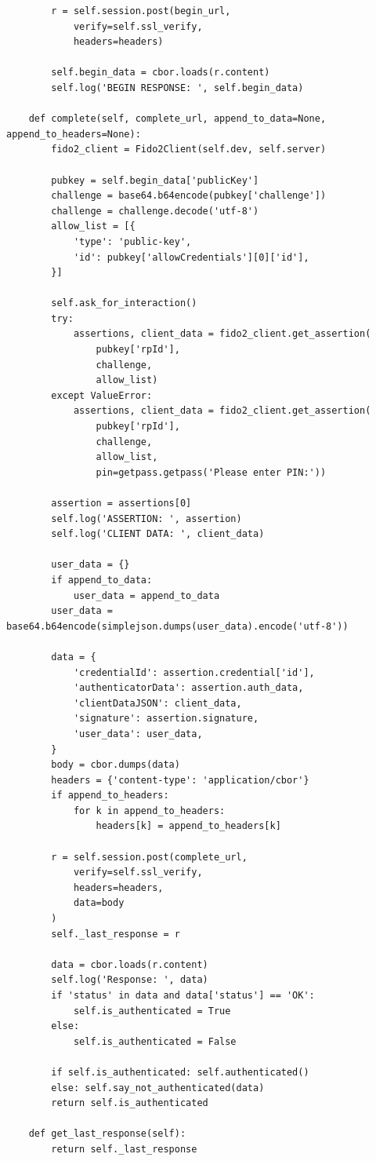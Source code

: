 \documentclass[11pt]{article}
\begin{document}
\begin{lstlisting}
        r = self.session.post(begin_url,
            verify=self.ssl_verify,
            headers=headers)

        self.begin_data = cbor.loads(r.content)
        self.log('BEGIN RESPONSE: ', self.begin_data)

    def complete(self, complete_url, append_to_data=None, append_to_headers=None):
        fido2_client = Fido2Client(self.dev, self.server)

        pubkey = self.begin_data['publicKey']
        challenge = base64.b64encode(pubkey['challenge'])
        challenge = challenge.decode('utf-8')
        allow_list = [{
            'type': 'public-key',
            'id': pubkey['allowCredentials'][0]['id'],
        }]

        self.ask_for_interaction()
        try:
            assertions, client_data = fido2_client.get_assertion(
                pubkey['rpId'],
                challenge,
                allow_list)
        except ValueError:
            assertions, client_data = fido2_client.get_assertion(
                pubkey['rpId'],
                challenge,
                allow_list,
                pin=getpass.getpass('Please enter PIN:'))

        assertion = assertions[0]
        self.log('ASSERTION: ', assertion)
        self.log('CLIENT DATA: ', client_data)

        user_data = {}
        if append_to_data:
            user_data = append_to_data
        user_data = base64.b64encode(simplejson.dumps(user_data).encode('utf-8'))

        data = {
            'credentialId': assertion.credential['id'],
            'authenticatorData': assertion.auth_data,
            'clientDataJSON': client_data,
            'signature': assertion.signature,
            'user_data': user_data,
        }
        body = cbor.dumps(data)
        headers = {'content-type': 'application/cbor'}
        if append_to_headers:
            for k in append_to_headers:
                headers[k] = append_to_headers[k]

        r = self.session.post(complete_url,
            verify=self.ssl_verify,
            headers=headers,
            data=body
        )
        self._last_response = r

        data = cbor.loads(r.content)
        self.log('Response: ', data)
        if 'status' in data and data['status'] == 'OK':
            self.is_authenticated = True
        else:
            self.is_authenticated = False

        if self.is_authenticated: self.authenticated()
        else: self.say_not_authenticated(data)
        return self.is_authenticated

    def get_last_response(self):
        return self._last_response

\end{lstlisting}
\end{document}

